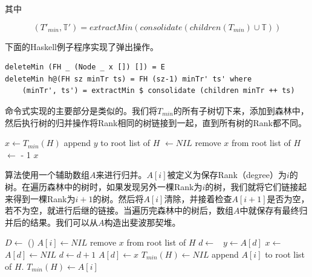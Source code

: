 \documentclass[b5paper]{ctexart}
\begin{document}
其中

\[
  (T'_{min}, \mathbb{T}') = extractMin(consolidate(children(T_{min}) \cup \mathbb{T}))
\]

下面的Haskell例子程序实现了弹出操作。

\lstset{language=Haskell}
\begin{lstlisting}[style=Haskell]
deleteMin (FH _ (Node _ x []) []) = E
deleteMin h@(FH sz minTr ts) = FH (sz-1) minTr' ts' where
    (minTr', ts') = extractMin $ consolidate (children minTr ++ ts)
\end{lstlisting} %

命令式实现的主要部分是类似的。我们将$T_{min}$的所有子树切下来，添加到森林中，然后执行树的归并操作将Rank相同的树链接到一起，直到所有树的Rank都不同。

\begin{algorithmic}[1]
  \State $x \gets T_{min}(H)$
      \State append $y$ to root list of $H$
      \State {} $\gets NIL$
    \EndFor
    \State remove $x$ from root list of $H$
    \State {} $\gets$  - 1
    \State {}
  \EndIf
  \State \Return $x$
\EndFunction
\end{algorithmic}

算法使用一个辅助数组$A$来进行归并。$A[i]$被定义为保存Rank（degree）为$i$的树。在遍历森林中的树时，如果发现另外一棵Rank为$i$的树，我们就将它们链接起来得到一棵Rank为$i+1$的树。然后将$A[i]$清除，并接着检查$A[i+1]$是否为空，若不为空，就进行后继的链接。当遍历完森林中的树后，数组$A$中就保存有最终归并后的结果。我们可以从$A$构造出斐波那契堆。

\begin{algorithmic}[1]
  \State $D \gets $ ()
    \State $A[i] \gets NIL$
  \EndFor
    \State remove $x$ from root list of $H$
    \State $d \gets $ 
    \
      \State $y \gets A[d]$
      \State $x \gets $ 
      \State $A[d] \gets NIL$
      \State $d \gets d + 1$
    \EndWhile
    \State $A[d] \gets x$
  \EndFor
  \State $T_{min}(H) \gets NIL$ 
      \State append $A[i]$ to root list of $H$.
        \State $T_{min}(H) \gets A[i]$
      \EndIf
    \EndIf
  \EndFor
\EndFunction
\end{algorithmic}
\end{document}
